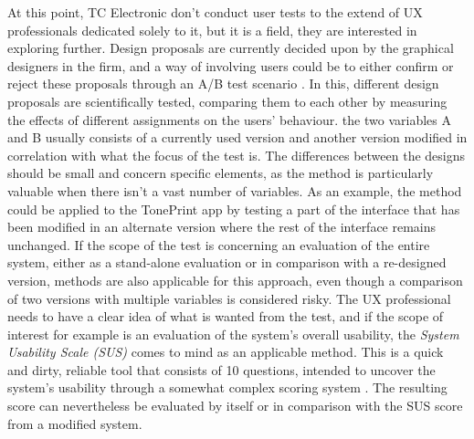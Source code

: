 \noindent
At this point, TC Electronic don't conduct user tests to the extend of UX professionals dedicated solely to it, but it is a field, they are interested in exploring further. Design proposals are currently decided upon by the graphical designers in the firm, and a way of involving users could be to either confirm or reject these proposals through an A/B test scenario \parencite[][224]{PDF:DonNorman}. In this, different design proposals are scientifically tested, comparing them to each other by measuring the effects of different assignments on the users' behaviour. the two variables A and B usually consists of a currently used version and another version modified in correlation with what the focus of the test is. The differences between the designs should be small and concern specific elements, as the method is particularly valuable when there isn't a vast number of variables. As an example, the method could be applied to the TonePrint app by testing a part of the interface that has been modified in an alternate version where the rest of the interface remains unchanged. If the scope of the test is concerning an evaluation of the entire system, either as a stand-alone evaluation or in comparison with a re-designed version, methods are also applicable for this approach, even though a comparison of two versions with multiple variables is considered risky. The UX professional needs to have a clear idea of what is wanted from the test, and if the scope of interest for example is an evaluation of the system's overall usability, the \textit{System Usability Scale (SUS)} comes to mind as an applicable method. This is a quick and dirty, reliable tool that consists of 10 questions, intended to uncover the system's usability through a somewhat complex scoring system \parencite{WEB:SUSkilde}. The resulting score can nevertheless be evaluated by itself or in comparison with the SUS score from a modified system.\\

